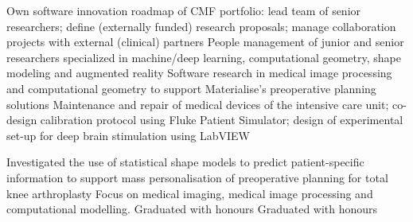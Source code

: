 \documentclass[
	a4paper,
	sidesectionsize=Large,
	maincolor=cvprimary,
	sectioncolor=cvprimary,
	sidecolor=cvprimary!10,
	topbottommargin=0.02\paperheight,
	leftrightmargin=0.02\paperwidth,
	profilepiczoom=1.6,
	profilepicxshift=-1mm,
	profilepicyshift=-7mm,
	profilepicrounding=0.5cm,
]{fortysecondscv}
\begin{document}
\makefrontsidebar
\newlength{\firstpagespacing}
\setlength{\firstpagespacing}{4ex}

\vspace{\firstpagespacing}
\vspace*{-1ex}
\begin{cvtable}[3.5]
	{Own software innovation roadmap of CMF portfolio: lead team of senior researchers; define (externally funded) research proposals; manage collaboration projects with external (clinical) partners}
	{People management of junior and senior researchers specialized in machine/deep learning, computational geometry, shape modeling and augmented reality}
	{Software research in medical image processing and computational geometry to support Materialise's preoperative planning solutions}
	{Maintenance and repair of medical devices of the intensive care unit; co-design calibration protocol using Fluke Patient Simulator; design of experimental set-up for deep brain stimulation using LabVIEW}
\end{cvtable}

\vspace{\firstpagespacing}
\vspace*{-1ex}
\begin{cvtable}[3.5]	
	{Investigated the use of statistical shape models to predict patient-specific information to support mass personalisation of preoperative planning for total knee arthroplasty}
		{Focus on medical imaging, medical image processing and computational modelling. Graduated with honours}
		{Graduated with honours}
\end{cvtable}
\end{document}
